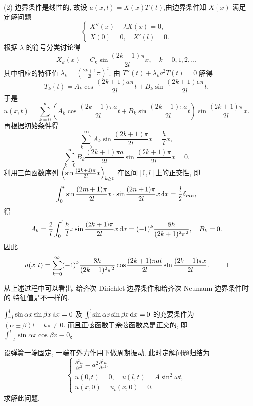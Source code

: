\begin{solve}
  (2) 边界条件是线性的, 故设 $u(x,t)=X(x)T(t)$,由边界条件知 $X(x)$ 满足定解问题
  \[\begin{cases}
    X''(x)+\lambda X(x) = 0, \\
    X(0) = 0,\quad X'(l) = 0.
  \end{cases}\]
  根据 $\lambda$ 的符号分类讨论得
  \[X_k(x)=C_k\sin \frac{(2k+1)\pi}{2l}x,\quad k=0,1,2,\ldots\]
  其中相应的特征值 $\lambda_k=\left(\frac{2k+1}{2l}\pi\right)^2$.
  由 $T''(t)+\lambda_k a^2T(t)=0$ 解得
  \[T_k(t) = A_k\cos\frac{(2k+1)a\pi}{2l}t+B_k\sin \frac{(2k+1)a\pi}{2l}t.\]
  于是
  \[u(x,t) = \sum_{k=0}^{\infty}\left(A_k\cos\frac{(2k+1)\pi a}{2l}t
    + B_k\sin \frac{(2k+1)\pi a}{2l}t\right)\sin \frac{(2k+1)\pi}{2l}x.\]
  再根据初始条件得
  \[\sum_{k=0}^{\infty}A_k\sin \frac{(2k+1)\pi}{2l}x=\frac{h}{l}x,\]
  \[\sum_{k=0}^{\infty}B_k\frac{(2k+1)\pi a}{2l}\sin \frac{(2k+1)\pi}{2l}x = 0.\]
  利用三角函数序列 $\Bigl(\sin \frac{(2k+1)\pi}{2l}x\Bigr)_{k\geq 0}$
  在区间$[0,l]$上的正交性, 即
  \[\int_0^l\sin \frac{(2m+1)\pi}{2l}x\cdot\sin \frac{(2n+1)\pi}{2l}x\mathop{}\!\mathrm{d} x
    = \frac{l}{2}\delta_{mn},\]
  得
  \[A_k=\frac{2}{l}\int_0^l\frac{h}{l}x\sin \frac{(2k+1)\pi}{2l}x\mathop{}\!\mathrm{d} x
    =(-1)^k\frac{8h}{(2k+1)^2\pi^2},\quad B_k = 0.\]
  因此
  \[u(x,t) = \sum_{k=0}^{\infty}(-1)^k\frac{8h}{(2k+1)^2\pi^2}\cos\frac{(2k+1)\pi at}{2l}
    \sin\frac{(2k+1)\pi x}{2l}.\qedhere\]
\end{solve}

\begin{remark}
  从上述过程中可以看出, 给齐次 Dirichlet 边界条件和给齐次 Neumann 边界条件时的
  特征值是不一样的.
\end{remark}

\begin{remark}
  $\int_{-l}^l\sin\alpha x\sin\beta x\mathop{}\!\mathrm{d} x=0$ 及 $\int_0^l\sin\alpha x\sin\beta x\mathop{}\!\mathrm{d} x=0$
  的充要条件为 $(\alpha\pm\beta)l=k\pi\neq 0$. 而且正弦函数于余弦函数总是正交的, 
  即 $\int_{-l}^l\sin\alpha x\cos\beta x\equiv 0$。
\end{remark}


\begin{exercise}
  设弹簧一端固定, 一端在外力作用下做周期振动, 此时定解问题归结为
  \[\begin{cases}
    \frac{\partial^2u}{\partial t^2} = a^2 \frac{\partial^2u}{\partial x^2}, \\
    u(0,t) = 0, \quad u(l,t) = A\sin^2\omega t, \\
    u(x,0) = u_t(x,0) = 0.
  \end{cases}\]
  求解此问题.
\end{exercise}

